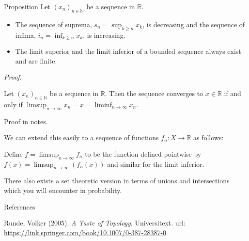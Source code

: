 \documentclass [aspectratio=169]{beamer}
\newcommand{\R}{{\mathbb{R}}}
\newcommand{\N}{{\mathbb{N}}}
\begin{document}
\begin{frame}
\begin{exampleblock}{Proposition}
Let $(x_n)_{n \in \N}$ be a sequence in $\R$.
\begin{itemize} 
\item The sequence of suprema, $s_n = \sup_{k\geq n} x_k$, is decreasing and the sequence of infima, $i_n = \inf_{k\geq n} x_k$, is increasing.
\item The limit superior and the limit inferior of a bounded sequence always exist and are finite.
\end{itemize}
\end{exampleblock}
\textit{Proof}.
\vspace{2.5cm}
\end{frame}

\begin{frame}
\begin{theorem}
Let $(x_n)_{n\in \N}$ be a sequence in $\R$. Then the sequence converges to $x\in \R$ if and only if $\limsup_{n\to \infty} x_n= x =\liminf_{n\to \infty} x_n$.
\end{theorem}

\vspace{0.5em}
Proof in notes.
\end{frame}



\begin{frame}
\vspace{2em}
We can extend this easily to a sequence of functions $f_n \colon X \to \R$ as follows:
\vspace{0.5em}

Define $f = \limsup_{n\to \infty } f_n$ to be the function defined pointwise by $f(x) = \limsup_{n\to \infty } (f_n (x)) $ and similar for the limit inferior. 

\vspace{1em}

There also exists a set theoretic version in terms of unions and intersections which you will encounter in probability.

\end{frame}




\begin{frame}{References}



Runde, Volker (2005). \textit{A Taste of Topology}. Universitext.  url:  \href{https://link.springer.com/book/10.1007/0-387-28387-0}{https://link.springer.com/book/10.1007/0-387-28387-0} 


\end{frame}
\end{document}
